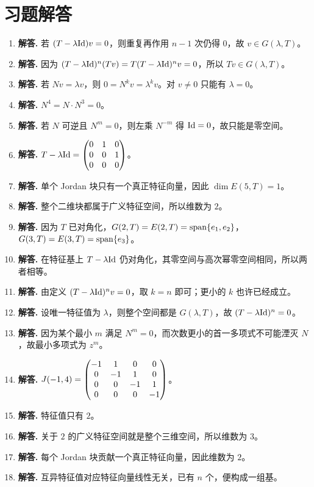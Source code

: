 \section*{习题解答}
\begin{enumerate}[label=\textbf{\arabic*.}, leftmargin=*, itemsep=1em]
\item \textbf{解答.} 若 $(T-\lambda\mathrm{Id})v=0$，则重复再作用 $n-1$ 次仍得 $0$，故 $v\in G(\lambda,T)$。
\item \textbf{解答.} 因为 $(T-\lambda\mathrm{Id})^n(Tv)=T(T-\lambda\mathrm{Id})^nv=0$，所以 $Tv\in G(\lambda,T)$。
\item \textbf{解答.} 若 $Nv=\lambda v$，则 $0=N^kv=\lambda^kv$。对 $v\neq0$ 只能有 $\lambda=0$。
\item \textbf{解答.} $N^4=N\cdot N^3=0$。
\item \textbf{解答.} 若 $N$ 可逆且 $N^m=0$，则左乘 $N^{-m}$ 得 $\mathrm{Id}=0$，故只能是零空间。
\item \textbf{解答.} $T-\lambda\mathrm{Id}=\begin{pmatrix} 0&1&0\\0&0&1\\0&0&0 \end{pmatrix}$。
\item \textbf{解答.} 单个 Jordan 块只有一个真正特征向量，因此 $\dim E(5,T)=1$。
\item \textbf{解答.} 整个二维块都属于广义特征空间，所以维数为 $2$。
\item \textbf{解答.} 因为 $T$ 已对角化，$G(2,T)=E(2,T)=\operatorname{span}\{e_1,e_2\}$，$G(3,T)=E(3,T)=\operatorname{span}\{e_3\}$。
\item \textbf{解答.} 在特征基上 $T-\lambda\mathrm{Id}$ 仍对角化，其零空间与高次幂零空间相同，所以两者相等。
\item \textbf{解答.} 由定义 $(T-\lambda\mathrm{Id})^nv=0$，取 $k=n$ 即可；更小的 $k$ 也许已经成立。
\item \textbf{解答.} 设唯一特征值为 $\lambda$，则整个空间都是 $G(\lambda,T)$，故 $(T-\lambda\mathrm{Id})^n=0$。
\item \textbf{解答.} 因为某个最小 $m$ 满足 $N^m=0$，而次数更小的首一多项式不可能湮灭 $N$，故最小多项式为 $z^m$。
\item \textbf{解答.} $J(-1,4)=\begin{pmatrix} -1&1&0&0\\0&-1&1&0\\0&0&-1&1\\0&0&0&-1 \end{pmatrix}$。
\item \textbf{解答.} 特征值只有 $2$。
\item \textbf{解答.} 关于 $2$ 的广义特征空间就是整个三维空间，所以维数为 $3$。
\item \textbf{解答.} 每个 Jordan 块贡献一个真正特征向量，因此维数为 $2$。
\item \textbf{解答.} 互异特征值对应特征向量线性无关，已有 $n$ 个，便构成一组基。

\end{enumerate}
